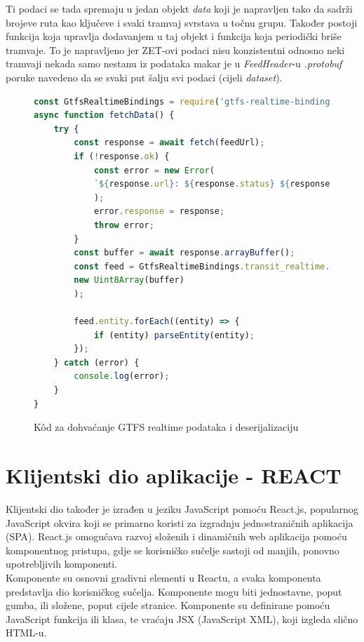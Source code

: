 \documentclass[zavrsnirad]{fer}
\begin{document}
Ti podaci se tada spremaju u jedan objekt \textit{data} koji je napravljen tako da sadrži brojeve ruta kao ključeve i svaki tramvaj svrstava u točnu grupu. Također postoji funkcija koja upravlja dodavanjem u taj objekt i funkcija koja periodički briše tramvaje. To je napravljeno jer ZET-ovi podaci nisu konzistentni odnosno neki tramvaji nekada samo nestanu iz podataka makar je u \textit{FeedHeader}-u \textit{.protobuf} poruke navedeno da se svaki put šalju svi podaci (cijeli \textit{dataset}).

\begin{figure}[H]
	\centering
	\begin{minipage}{0.9\linewidth}
		\begin{lstlisting}[language=JavaScript]
const GtfsRealtimeBindings = require('gtfs-realtime-bindings');
async function fetchData() {
	try {
		const response = await fetch(feedUrl);
		if (!response.ok) {
			const error = new Error(
			`${response.url}: ${response.status} ${response.statusText}`
			);
			error.response = response;
			throw error;
		}
		const buffer = await response.arrayBuffer();
		const feed = GtfsRealtimeBindings.transit_realtime.FeedMessage.decode(
		new Uint8Array(buffer)
		);
		
		feed.entity.forEach((entity) => {
			if (entity) parseEntity(entity);
		});
	} catch (error) {
		console.log(error);
	}
}
		\end{lstlisting}
	\end{minipage}
	\caption{K\^od za dohvaćanje GTFS realtime podataka i deserijalizaciju}
	\label{slk:dohvatGTFS}
\end{figure}
\newpage

\section{Klijentski dio aplikacije - REACT}
\label{sec:frontend}

Klijentski dio također je izrađen u jeziku JavaScript pomoću React.js, popularnog JavaScript okvira koji se primarno koristi za izgradnju jednostraničnih aplikacija (SPA). React.js omogućava razvoj složenih i dinamičnih web aplikacija pomoću komponentnog pristupa, gdje se korisničko sučelje sastoji od manjih, ponovno upotrebljivih komponenti.\\
Komponente su osnovni gradivni elementi u Reactu, a svaka komponenta predstavlja dio korisničkog sučelja. Komponente mogu biti jednostavne, poput gumba, ili složene, poput cijele stranice. Komponente su definirane pomoću JavaScript funkcija ili klasa, te vraćaju JSX (JavaScript XML), koji izgleda slično HTML-u.\\
\end{document}

